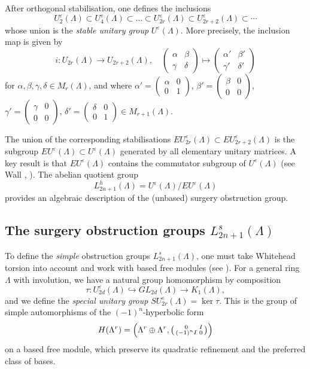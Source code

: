 \documentclass[11pt,a4paper,leqno]{amsart}
\theoremstyle{definition}
\theoremstyle{remark}
\renewcommand{\l}{\Lambda}
\newcommand{\La}{\Lambda}
\newcommand{\SU}{SU^{\varepsilon}}
\newcommand{\U}{U^{\varepsilon}}
\newcommand{\EU}{EU^{\varepsilon}}
\begin{document}
 After orthogonal stabilisation, one defines the inclusions
$$ \U_{2}(\La) \subset \U_{4}(\La) \subset \dots \subset \U_{2r}(\La) \subset \U_{2r+2}(\La) \subset \cdots$$
whose union is the \emph{stable unitary group} $\U(\La)$. 
 More precisely, the inclusion map is given by
\[ i \colon U_{2r}(\La) \to U_{2r+2}(\La), \quad \left(\begin{smallmatrix} \alpha & \beta \\ \gamma & \delta \end{smallmatrix}\right) \mapsto \left(\begin{smallmatrix} \alpha' & \beta' \\ \gamma' & \delta' \end{smallmatrix}\right) \]
for $\alpha, \beta, \gamma, \delta \in M_r(\l)$, and where $\alpha' = \left(\begin{smallmatrix} \alpha & 0 \\ 0 & 1 \end{smallmatrix}\right)$, $\beta' = \left(\begin{smallmatrix} \beta & 0 \\ 0 & 0 \end{smallmatrix}\right)$, $\gamma' = \left(\begin{smallmatrix} \gamma & 0 \\ 0 & 0 \end{smallmatrix}\right)$, $\delta' = \left(\begin{smallmatrix} \delta & 0 \\ 0 & 1 \end{smallmatrix}\right) \in M_{r+1}(\l)$.



\smallskip
The union of the corresponding stabilisations 
$\EU_{2r}(\La)\subset \EU_{2r+2}(\La)$ is the subgroup $\EU(\La) \subset \U(\La)$ generated by all elementary unitary matrices. A key result is that $\EU(\La)$ contains the commutator subgroup of $\U(\La)$ (see Wall \cite[Chapter 6]{Wall:1970}, \cite[Theorem 4.2]{Ranicki:1973}). The abelian quotient group
$$L^h_{2n+1}(\La) = \U(\La) / \EU(\La)$$
provides an algebraic description of the (unbased) surgery obstruction group.


\subsection{The surgery obstruction groups $L^s_{2n+1}(\La)$}
To define the \emph{simple} obstruction groups $L^s_{2n+1}(\La)$, one must take Whitehead torsion into account and work with based free modules (see \cite{Milnor:1966}). For a general ring $\La$ with involution,
we have a natural group homomorphism by composition
\[ \tau\colon \U_{2d}(\La) \hookrightarrow GL_{2d}(\l) \to K_1(\La),  \]
and we define the \emph{special unitary group} $\SU_{2r}(\La) = \ker \tau$. 
This is the group of simple
automorphisms of the $(-1)^n$-hyperbolic  form 
\[ H(\La^r) = \Bigl (\La^r \oplus \La^r, \bigl (\begin{smallmatrix} 0 & I \\ (-1)^nI & 0 \end{smallmatrix}\bigr) \Bigr ) \]
on a based free module, which preserve its quadratic refinement and the preferred class of bases.
\end{document}
